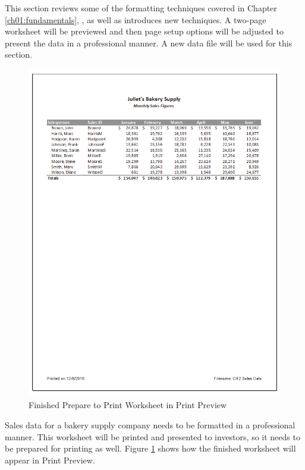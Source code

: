 This section reviews some of the formatting techniques covered in Chapter \ref{ch01:fundamentals}, , as well as introduces new techniques. A two-page worksheet will be previewed and then page setup options will be adjusted to present the data in a professional manner. A new data file will be used for this section.

\begin{figure}[H]
	\centering
	\includegraphics[width=\maxwidth{.95\linewidth}]{gfx/ch02_fig40}
	\caption{Finished Prepare to Print Worksheet in Print Preview}
	\label{02:fig40}
\end{figure}

Sales data for a bakery supply company needs to be formatted in a professional manner. This worksheet will be printed and presented to investors, so it needs to be prepared for printing as well. Figure \ref{02:fig40} shows how the finished worksheet will appear in Print Preview.

